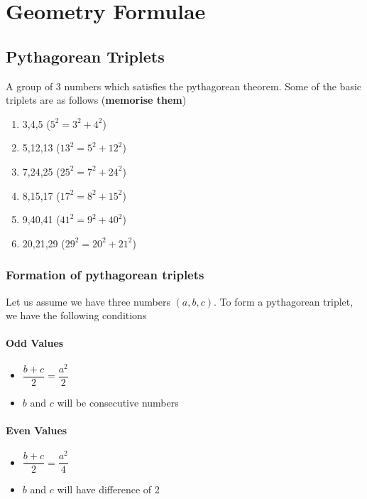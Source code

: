 \chapter{Geometry Formulae}

\section{Pythagorean Triplets}

A group of 3 numbers which satisfies the pythagorean theorem. Some of the basic triplets are as follows (\textbf{memorise them})
\begin{enumerate}
    \item 3,4,5 ($5^2 = 3^2 + 4^2$)
    \item 5,12,13 ($13^2 = 5^2 + 12^2$)
    \item 7,24,25 ($25^2 = 7^2 + 24^2$)
    \item 8,15,17 ($17^2 = 8^2 + 15^2$)
    \item 9,40,41 ($41^2 = 9^2 + 40^2$)
    \item 20,21,29 ($29^2 = 20^2 + 21^2$)
\end{enumerate}

\subsection{Formation of pythagorean triplets}
Let us assume we have three numbers $(a,b,c)$. To form a pythagorean triplet, we have the following conditions

\subsubsection{Odd Values}
\begin{itemize}
    \item $\dfrac{b + c}{2} = \dfrac{a^2}{2}$
    \item $b$ and $c$ will be consecutive numbers
\end{itemize}

\subsubsection{Even Values}
\begin{itemize}
    \item $\dfrac{b + c}{2} = \dfrac{a^2}{4}$
    \item $b$ and $c$ will have difference of 2
\end{itemize}
